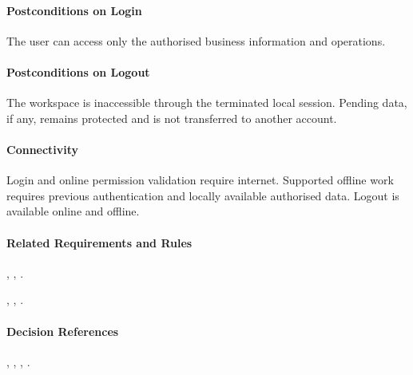 \paragraph{Postconditions on Login}

The user can access only the authorised business
    information and operations.

\paragraph{Postconditions on Logout}

The workspace is inaccessible through the terminated
    local session.
    Pending data, if any, remains protected and is not
    transferred to another account.

\paragraph{Connectivity}

Login and online permission validation require internet.
    Supported offline work requires previous authentication
    and locally available authorised data.
    Logout is available online and offline.

\paragraph{Related Requirements and Rules}
\hyperref[fr:002]{}, \hyperref[fr:003]{}, \hyperref[fr:004]{}.

\hyperref[br:002]{}, \hyperref[br:003]{}, \hyperref[br:004]{}.

\paragraph{Decision References}
, , , .
